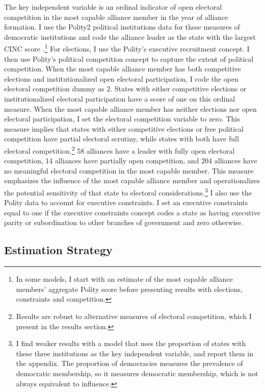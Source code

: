 \documentclass[12pt]{article}
\begin{document}
The key independent variable is an ordinal indicator of open electoral competition in the most capable alliance member in the year of alliance formation. 
I use the Polity2 political institutions data for these measures of democratic institutions and code the alliance leader as the state with the largest CINC score \citep{SingerCINC1988}.\footnote{In some models, I start with an estimate of the most capable alliance members' aggregate Polity score before presenting results with elections, constraints and competition.}
For elections, I use the Polity's executive recruitment concept. 
I then use Polity's political competition concept to capture the extent of political competition. 
When the most capable alliance member has both competitive elections and institutionalized open electoral participation, I code the open electoral competition dummy as 2.
States with either competitive elections or institutionalized electoral participation have a score of one on this ordinal measure. 
When the most capable alliance member has neither elections nor open electoral participation, I set the electoral competition variable to zero.
This measure implies that states with either competitive elections or free political competition have partial electoral scrutiny, while states with both have full electoral competition.\footnote{Results are robust to alternative measures of electoral competition, which I present in the results section.}
58 alliances have a leader with fully open electoral competition, 14 alliances have partially open competition, and 204 alliances have no meaningful electoral competition in the most capable member. 
This measure emphasizes the influence of the most capable alliance member and operationalizes the potential sensitivity of that state to electoral considerations.\footnote{I find weaker results with a model that uses the proportion of states with these three institutions as the key independent variable, and report them in the appendix. The proportion of democracies measures the prevalence of democratic membership, so it measures democratic membership, which is not always equivalent to influence.}    
I also use the Polity data to account for executive constraints.
I set an executive constraints equal to one if the executive constraints concept codes a state as having executive parity or subordination to other branches of government and zero otherwise.



\subsection{Estimation Strategy}
\end{document}
